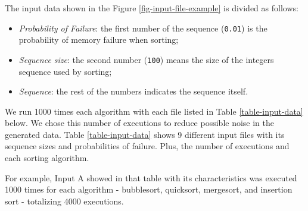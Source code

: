 The input data shown in the Figure \ref{fig-input-file-example} is divided as follows:

\begin{itemize}
    \item \textit{Probability of Failure}: the first number of the sequence (\texttt{0.01}) is the probability of memory failure when sorting;
    \item \textit{Sequence size}: the second number (\texttt{100}) means the size of the integers sequence used by sorting;
    \item \textit{Sequence}: the rest of the numbers indicates the sequence itself.
\end{itemize}

We run 1000 times each algorithm with each file listed in Table \ref{table-input-data} below. We chose this number of executions to reduce possible noise in the generated data. Table \ref{table-input-data} shows 9 different input files with its sequence sizes and probabilities of failure. Plus, the number of executions and each sorting algorithm.

For example, Input A showed in that table with its characteristics was executed 1000 times for each algorithm -  bubblesort, quicksort, mergesort, and insertion sort - totalizing 4000 executions.

